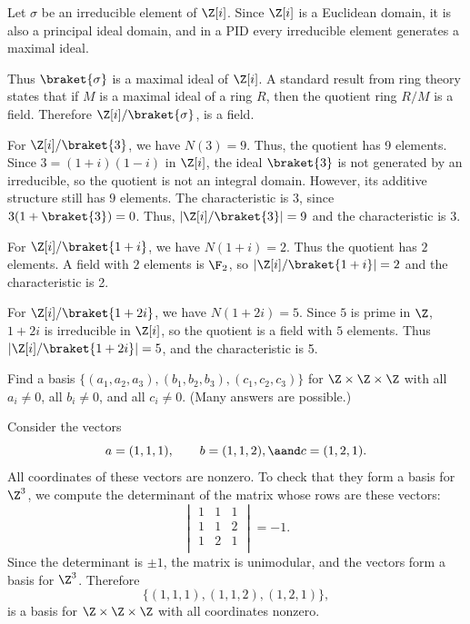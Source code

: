 \begin{solution}[(ii)]
  Let $\sigma$ be an irreducible element of $\Z[i]$. Since $\Z[i]$ is a Euclidean domain, it is also a principal ideal domain, and in a PID every irreducible element generates a maximal ideal.

  Thus $\braket{\sigma}$ is a maximal ideal of $\Z[i]$. A standard result from ring theory states that if $M$ is a maximal ideal of a ring $R$, then the quotient ring $R/M$ is a field. Therefore $\Z[i]/\braket{\sigma}$, is a field.
\end{solution}

\begin{solution}[(iii)]
  For $\Z[i]/\braket{3}$, we have $N(3) = 9$. Thus, the quotient has 9 elements. Since $3 = (1 + i)(1 - i)$ in $\Z[i]$, the ideal $\braket{3}$ is not generated by an irreducible, so the quotient is not an integral domain. However, its additive structure still has $9$ elements. The characteristic is $3$, since $3(1 + \braket{3}) = 0$. Thus, $|\Z[i]/\braket{3}| = 9$ and the characteristic is 3.

  For $\Z[i]/\braket{1 + i}$, we have $N(1 + i) = 2$. Thus the quotient has $2$ elements. A field with $2$ elements is $\F_2$, so $|\Z[i]/\braket{1 + i}| = 2$ and the characteristic is 2.

  For $\Z[i]/\braket{1 + 2i}$, we have $N(1 + 2i) = 5$. Since $5$ is prime in $\Z$, $1 + 2i$ is irreducible in $\Z[i]$, so the quotient is a field with $5$ elements. Thus $|\Z[i]/\braket{1 + 2i}| = 5$, and the characteristic is 5.
\end{solution}

\begin{problem}[19.1]
  Find a basis $\{(a_1, a_2, a_3), (b_1, b_2, b_3), (c_1, c_2, c_3)\}$ for $\Z \times \Z \times \Z$ with all $a_i \ne 0$, all $b_i \ne 0$, and all $c_i \ne 0$. (Many answers are possible.)
\end{problem}

\begin{solution}
  Consider the vectors
  \[%
    a = (1, 1, 1), \qquad b = (1, 1, 2), \aand c = (1, 2, 1)
  .\]%
  All coordinates of these vectors are nonzero. To check that they form a basis for $\Z^3$, we compute the determinant of the matrix whose rows are these vectors:
  \[%
    \begin{vmatrix}
      1 & 1 & 1 \\
      1 & 1 & 2 \\
      1 & 2 & 1 \\
    \end{vmatrix} = -1
  .\]%
  Since the determinant is $\pm 1$, the matrix is unimodular, and the vectors form a basis for $\Z^3$. Therefore
  \[%
    \{(1, 1, 1), (1, 1, 2), (1, 2, 1)\}
  ,\]%
  is a basis for $\Z \times \Z \times \Z$ with all coordinates nonzero.
\end{solution}

